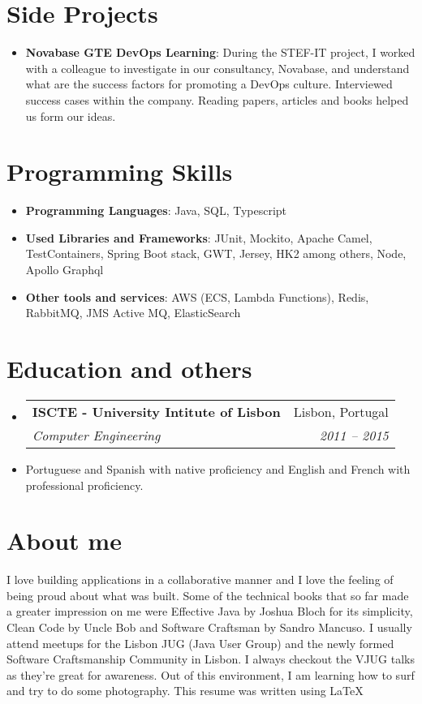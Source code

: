 \documentclass[letterpaper,11pt]{article}
\makeatletter
\newcommand{\resumeItem}[2]{
  \item\small{
    \textbf{#1}{: #2 \vspace{-4pt}}
  }
}
\newcommand{\resumeItemSimple}[1]{
  \item\small{
    {#1 \vspace{-2pt}}
  }
}
\newcommand{\resumeSubheading}[4]{
  \vspace{-2pt}\item
    \begin{tabular*}{0.97\textwidth}[t]{l@{\extracolsep{\fill}}r}
      \textbf{#1} & #2 \\
      \textit{\small#3} & \textit{\small #4} \\
    \end{tabular*}\vspace{-2pt}
}
\newcommand{\resumeSubItem}[2]{\resumeItem{#1}{#2}\vspace{-5pt}}
\newcommand{\resumeSubHeadingListStart}{\begin{itemize}[leftmargin=*]}
\newcommand{\resumeSubHeadingListEnd}{\end{itemize}}
\makeatother
\begin{document}
\section{Side Projects}
  \resumeSubHeadingListStart
    \resumeSubItem{Novabase GTE DevOps Learning}
      {During the STEF-IT project, I worked with a colleague to investigate in our consultancy, Novabase, and understand what are the success factors for promoting a DevOps culture. Interviewed success cases within the company. Reading papers, articles and books helped us form our ideas.}
  \resumeSubHeadingListEnd

\section{Programming Skills}
  \resumeSubHeadingListStart
    \resumeItemSimple
      {\textbf{Programming Languages}: Java, SQL, Typescript}
    \resumeItemSimple
      {\textbf{Used Libraries and Frameworks}: JUnit, Mockito, Apache Camel, TestContainers, Spring Boot stack, GWT, Jersey, HK2 among others, Node, Apollo Graphql}
    \resumeItemSimple
      {\textbf{Other tools and services}: AWS (ECS, Lambda Functions), Redis, RabbitMQ, JMS Active MQ, ElasticSearch}
  \resumeSubHeadingListEnd

\section{Education and others}
  \resumeSubHeadingListStart
    \resumeSubheading
      {ISCTE - University Intitute of Lisbon}{Lisbon, Portugal}
      {Computer Engineering}{2011 -- 2015}
    \resumeItemSimple
      {Portuguese and Spanish with native proficiency and English and French with professional proficiency.}
  \resumeSubHeadingListEnd
  
\section{About me}
  \small{I love building applications in a collaborative manner and I love the feeling of being proud about what was built.\newline
  Some of the technical books that so far made a greater impression on me were Effective Java by Joshua Bloch for its simplicity, Clean Code by Uncle Bob and Software Craftsman by Sandro Mancuso. 
  I usually attend meetups for the Lisbon JUG (Java User Group) and the newly formed Software Craftsmanship Community in Lisbon. I always checkout the VJUG talks as they're great for awareness.
  Out of this environment, I am learning how to surf and try to do some photography.
  \newline
  This resume was written using \LaTeX
  }
\end{document}
